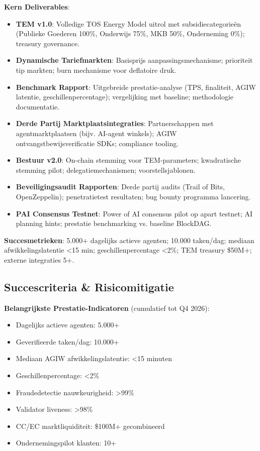 \documentclass[11pt]{article}
\begin{document}
\textbf{Kern Deliverables}:
\begin{itemize}[noitemsep]
  \item \textbf{TEM v1.0}: Volledige TOS Energy Model uitrol met subsidiecategorieën (Publieke Goederen 100\%, Onderwijs 75\%, MKB 50\%, Onderneming 0\%); treasury governance.
  \item \textbf{Dynamische Tariefmarkten}: Basisprijs aanpassingsmechanisme; prioriteit tip markten; burn mechanisme voor deflatoire druk.
  \item \textbf{Benchmark Rapport}: Uitgebreide prestatie-analyse (TPS, finaliteit, AGIW latentie, geschillenpercentage); vergelijking met baseline; methodologie documentatie.
  \item \textbf{Derde Partij Marktplaatsintegraties}: Partnerschappen met agentmarktplaatsen (bijv. AI-agent winkels); AGIW ontvangstbewijsverificatie SDKs; compliance tooling.
  \item \textbf{Bestuur v2.0}: On-chain stemming voor TEM-parameters; kwadratische stemming pilot; delegatiemechanismen; voorstellsjablonen.
  \item \textbf{Beveiligingsaudit Rapporten}: Derde partij audits (Trail of Bits, OpenZeppelin); penetratietest resultaten; bug bounty programma lancering.
  \item \textbf{PAI Consensus Testnet}: Power of AI consensus pilot op apart testnet; AI planning hints; prestatie benchmarking vs. baseline BlockDAG.
\end{itemize}

\textbf{Succesmetrieken}: 5.000+ dagelijks actieve agenten; 10.000 taken/dag; mediaan afwikkelingslatentie <15 min; geschillenpercentage <2\%; TEM treasury \$50M+; externe integraties 5+.

\subsection{Succescriteria \& Risicomitigatie}

\textbf{Belangrijkste Prestatie-Indicatoren} (cumulatief tot Q4 2026):
\begin{itemize}[noitemsep]
  \item Dagelijks actieve agenten: 5.000+
  \item Geverifieerde taken/dag: 10.000+
  \item Mediaan AGIW afwikkelingslatentie: <15 minuten
  \item Geschillenpercentage: <2\%
  \item Fraudedetectie nauwkeurigheid: >99\%
  \item Validator liveness: >98\%
  \item CC/EC marktliquiditeit: \$100M+ gecombineerd
  \item Ondernemingspilot klanten: 10+
\end{itemize}
\end{document}
